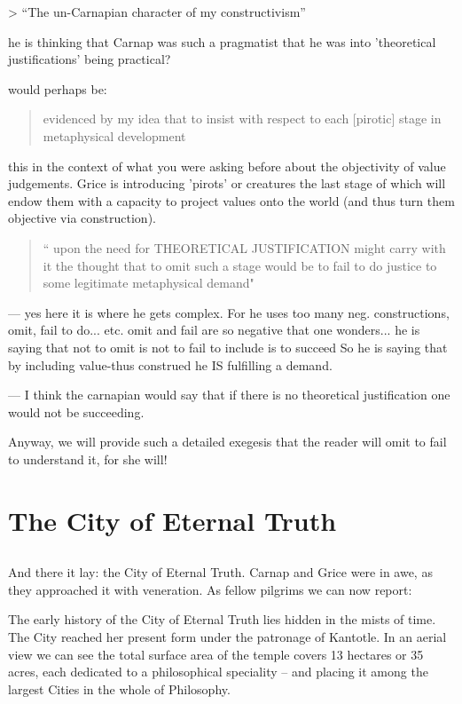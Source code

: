 \documentclass[10pt,titlepage]{book}
\begin{document}
>  ``The un-Carnapian character of my constructivism''
 

he is thinking that Carnap was such a pragmatist that he was into 'theoretical justifications' being practical?

would  perhaps  be:
\begin{quote}
evidenced by my idea that to insist
 with  respect to each [pirotic]  stage
 in metaphysical  development
\end{quote}
 
this in the context of what you were asking
before about the objectivity of
value judgements. Grice is introducing
'pirots' or creatures the last
stage of which will endow them
with a capacity to project
values onto the world
(and thus turn them objective
via construction).
 
\begin{quote} 
`` upon the need for
 THEORETICAL   JUSTIFICATION
 might carry with it the thought
 that to omit  such a  stage
 would be to fail to do justice
 to some  legitimate
 metaphysical  demand"
\end{quote}

  --- yes here it is where he gets complex. For he uses
  too many neg. constructions,
   omit, fail to do... etc.
  omit and fail are so negative that one wonders...
    he is saying that not to omit is not to fail
            to  include is to succeed
 So he is saying that by including value-thus construed
      he IS fulfilling a demand.
 
--- I think the carnapian would say
  that if there is no theoretical justification
 one would not be succeeding.

Anyway, we will provide such a detailed exegesis that the reader will  omit 
to fail to understand it, for she will!


\chapter{The City of Eternal Truth}

\section{}

And there it lay: the City of Eternal Truth. Carnap and Grice were in
awe, as they approached it with veneration. As fellow pilgrims we can
now report:

The early history of the City of Eternal Truth lies hidden in the mists
of time. The City reached her present form under the patronage of
Kantotle. In an aerial view we can see the total surface area of the
temple covers 13 hectares or 35 acres, each dedicated to a
philosophical speciality -- and placing it among the largest Cities in
the whole of Philosophy.
\end{document}
